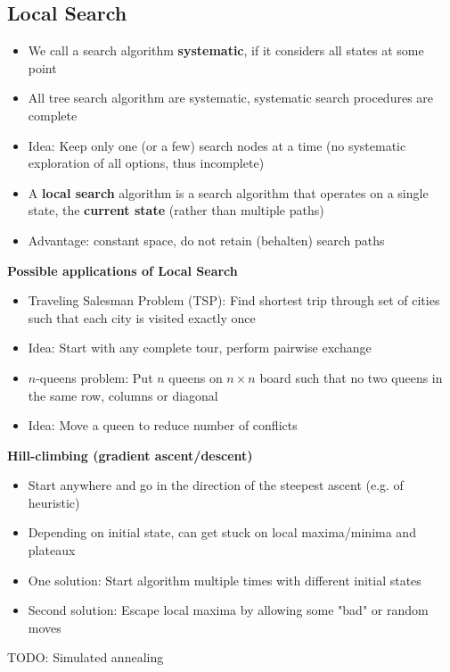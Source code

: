 \documentclass{scrartcl}
\begin{document}
\subsection{Local Search}
\begin{itemize}
    \item
        We call a search algorithm \textbf{systematic}, if it considers all states at some point
    \item
        All tree search algorithm are systematic, systematic search procedures are complete
    \item
        Idea: Keep only one (or a few) search nodes at a time (no systematic exploration of all options, thus incomplete)
    \item
        A \textbf{local search} algorithm is a search algorithm that operates on a single state, the \textbf{current state} (rather than multiple paths)
    \item
        Advantage: constant space, do not retain (behalten) search paths\\
\end{itemize}
\textbf{Possible applications of Local Search}
\begin{itemize}
    \item
        Traveling Salesman Problem (TSP): Find shortest trip through set of cities such that each city is visited exactly once
    \item
        Idea: Start with any complete tour, perform pairwise exchange
    \item
        $n$-queens problem: Put $n$ queens on $n \times n$ board such that no two queens in the same row, columns or diagonal
    \item
        Idea: Move a queen to reduce number of conflicts
\end{itemize}
\textbf{Hill-climbing (gradient ascent/descent)}
\begin{itemize}
    \item
        Start anywhere and go in the direction of the steepest ascent (e.g. of heuristic)
    \item
        Depending on initial state, can get stuck on local maxima/minima and plateaux
    \item
        One solution: Start algorithm multiple times with different initial states
    \item
        Second solution: Escape local maxima by allowing some "bad" or random moves
\end{itemize}
TODO: Simulated annealing
\end{document}
